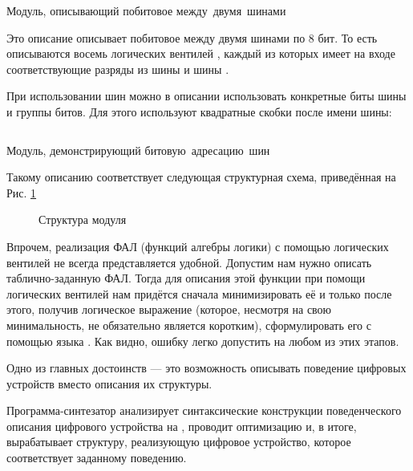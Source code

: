 \begin{listing}[H]
	\inputminted{SystemVerilog}{code_examples/lab_1/bus_or.sv}
	\caption{Модуль, описывающий побитовое  \mbox{между двумя шинами}}
\end{listing}


\par{Это описание описывает побитовое  между двумя шинами по 8 бит. То есть описываются восемь логических вентилей , каждый из которых имеет на входе соответствующие разряды из шины \emph{} и шины \emph{}.}

\par{При использовании шин можно в описании использовать конкретные биты шины и группы битов. Для этого используют квадратные скобки после имени шины:}


\begin{listing}[H]
	\inputminted{SystemVerilog}{code_examples/lab_1/bitwise_ops.sv}
	\caption{Модуль, демонстрирующий \mbox{битовую адресацию шин}}
\end{listing}


\par{Такому описанию соответствует следующая структурная схема, приведённая на Рис. \ref{fig:bitwiseops}}

\begin{figure}[H]
  \centering
  \def\svgwidth{12cm}
  
  \caption{Структура модуля }
  \label{fig:bitwiseops}
\end{figure}

\par{Впрочем, реализация ФАЛ (функций алгебры логики) с помощью логических вентилей не всегда представляется удобной. Допустим нам нужно описать таблично-заданную ФАЛ. Тогда для описания этой функции при помощи логических вентилей нам придётся сначала минимизировать её и только после этого, получив логическое выражение (которое, несмотря на свою минимальность, не обязательно является коротким), сформулировать его с помощью языка . Как видно, ошибку легко допустить на любом из этих этапов.}

\par{Одно из главных достоинств  — это возможность описывать поведение цифровых устройств вместо описания их структуры.}

\par{Программа-синтезатор анализирует синтаксические конструкции поведенческого описания цифрового устройства на , проводит оптимизацию и, в итоге, вырабатывает структуру, реализующую цифровое устройство, которое соответствует заданному поведению.}

